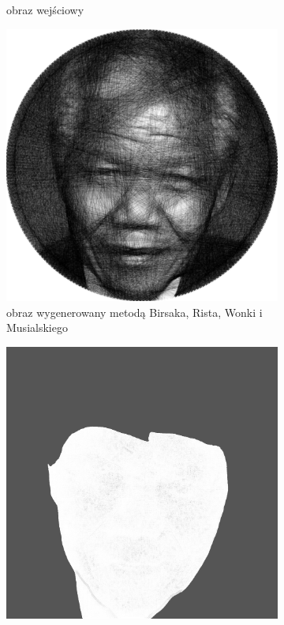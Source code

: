 \documentclass[a4paper, 12pt, polish, twoside]{extreport}
\begin{document}
\begin{figure}[H]
\begin{subfigure}{0.24\textwidth}
        \caption{obraz wejściowy}
        \label{comp-comp-gandhi-mandela-e}
    \end{subfigure}
    \begin{subfigure}{0.24\textwidth}
        \centering
        \includegraphics[width = \textwidth]{img/6-comp/mandela_birsak_.png}
        \caption{obraz wygenerowany metodą Birsaka, Rista, Wonki i Musialskiego}
        \label{comp-comp-gandhi-mandela-f}
    \end{subfigure}
    \begin{subfigure}{0.24\textwidth}
        \centering
        \includegraphics[width = \textwidth]{img/6-comp/mandela_mask_c15_inv0_bg5_obj1_ed1.png}

\end{subfigure}
\end{figure}
\end{document}
